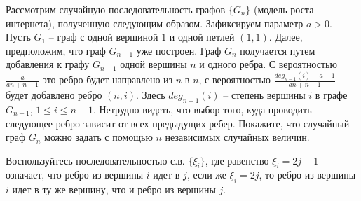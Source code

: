 \begin{problem}
\label{hnmgraph}
Рассмотрим случайную последовательность графов $\{G_n\}$ (модель роста интернета), полученную следующим образом. Зафиксируем параметр $a>0$. Пусть $G_1$ -- граф с одной вершиной $1$ и одной петлей $(1,1)$. Далее, предположим, что граф $G_{n-1}$ уже построен. Граф $G_n$ получается путем добавления к графу $G_{n-1}$ одной вершины $n$ и одного ребра. С вероятностью $\frac{a}{an+n-1}$  это ребро будет направлено из $n$ в $n$, с вероятностью $\frac{deg_{n-1}(i)+a-1}{an+n-1}$ будет добавлено ребро $(n,i)$. Здесь $deg_{n-1}(i)$ -- степень вершины $i$ в графе $G_{n-1}$, $1 \le i \le n-1$. Нетрудно видеть, что выбор того, куда проводить следующее ребро зависит от всех предыдущих ребер. Покажите, что случайный граф $G_n$ можно задать с помощью $n$ независимых случайных величин.
\end{problem}

\begin{ordre}
Воспользуйтесь последовательностью с.в. $\{\xi_i\}$, где равенство $\xi_i = 2j - 1$ означает, что ребро из вершины $i$ идет в $j$, если же   $\xi_i = 2j$, то  ребро из вершины $i$ идет в ту же вершину, что и ребро из вершины $j$.
\end{ordre}

